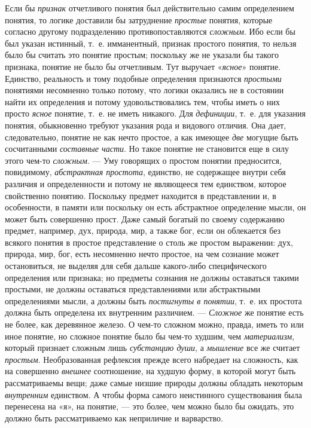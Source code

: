 \documentclass[twoside]{article}
\begin{document}
{{Если бы {\em признак}
отчетливого понятия был действительно самим определением
понятия, то логике доставили бы затруднение
{\em простые} понятия,
которые согласно другому подразделению противопоставляются
{\em сложным}. Ибо если
бы был указан истинный, т.~е. имманентный, признак простого понятия, то
нельзя было бы считать это понятие простым; поскольку же не указали бы
такого признака, понятие не было бы отчетливым. Тут выручает
«{\em ясное}» понятие.
Единство, реальность и тому подобные определения признаются
{\em простыми} понятиями
несомненно только потому, что логики оказались не в состоянии найти их
определения и потому удовольствовались тем, чтобы иметь о них просто
{\em ясное} понятие,
т.~е. не иметь никакого. Для
{\em дефиниции}, т.~е.
для указания понятия, обыкновенно требуют указания рода и видового отличия.
Она дает, следовательно, понятие не как нечто простое, а как имеющее
{\em две} могущие быть
сосчитанными {\em составные части}.
Но такое понятие не становится еще в силу этого чем-то
{\em сложным}. — Уму
говорящих о простом понятии предносится, повидимому,
{\em абстрактная простота},
единство, не содержащее внутри себя различия и определенности
и потому не являющееся тем единством, которое свойственно понятию.
Поскольку предмет находится в представлении и, в особенности, в памяти или
поскольку он есть абстрактное определение мысли, он может быть совершенно
прост. Даже самый богатый по своему содержанию предмет, например, дух,
природа, мир, а также бог, если он облекается без всякого понятия в простое
представление о столь же простом выражении: дух, природа, мир, бог, есть
несомненно нечто простое, на чем сознание может остановиться, не выделяя
для себя дальше какого-либо специфического определения или признака; но
предметы сознания не должны оставаться такими простыми, не должны
оставаться представлениями или абстрактными определениями мысли, а должны
быть {\em постигнуты в понятии},
т.~е. их простота должна быть определена их внутренним
различием. — {\em Сложное}
же понятие есть не более, как деревянное железо. О чем-то
сложном можно, правда, иметь то или иное понятие, но сложное понятие было
бы чем-то худшим, чем
{\em материализм},
который признает сложным лишь
{\em субстанцию души}, а
{\em мышление} все же
считает {\em простым}.
Необразованная рефлексия прежде всего набредает на сложность,
как на совершенно {\em внешнее}
соотношение, на худшую форму, в которой могут быть
рассматриваемы вещи; даже самые низшие природы должны обладать некоторым
{\em внутренним}
единством. А чтобы форма самого неистинного существования
была перенесена на «я», на понятие, — это более, чем можно
было бы ожидать, это должно быть рассматриваемо как
неприличие и варварство.

}}
\end{document}
